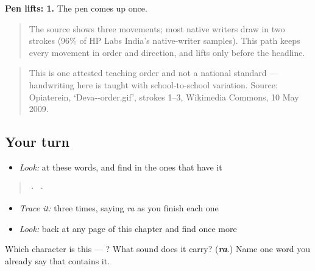 \textbf{Pen lifts: 1.} The pen comes up once.

\begin{quote}
The source shows three movements; most native writers draw  in two strokes (96\% of HP Labs India's native-writer samples). This path keeps every movement in order and direction, and lifts only before the headline.
\end{quote}

\begin{quote}
This is one attested teaching order and not a national standard — handwriting here is taught with school-to-school variation. Source: Opiaterein, ‘Deva--order.gif’, strokes 1–3, Wikimedia Commons, 10 May 2009.
\end{quote}

\subsection*{Your turn}
\begin{itemize}
\raggedright
  \item \emph{Look:} at these words, and find  in the ones that have it
\end{itemize}

\begin{quote}
  ·    ·  
\end{quote}

\begin{itemize}
\raggedright
  \item \emph{Trace it:}  three times, saying \emph{ra} as you finish each one
  \item \emph{Look:} back at any page of this chapter and find  once more
\end{itemize}

\begin{tcolorbox}[breakable,colback=teal!4,colframe=teal!35!black,title={Before you move on}]
Which character is this — ? What sound does it carry? (\emph{\textbf{ra}}.) Name one word you already say that contains it.
\end{tcolorbox}
